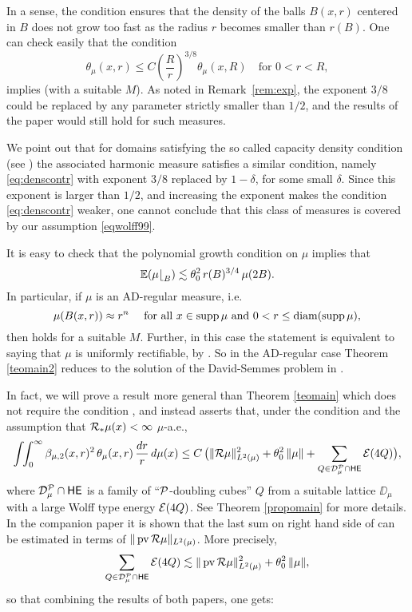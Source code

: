 \begin{rem}
	In a sense, the condition  ensures that the
	density of the balls $B(x,r)$ centered in $B$ does not grow too fast as the radius $r$ becomes
	smaller than $r(B)$. One can check easily that the condition
	\begin{equation}\label{eq:denscontr}
	\theta_{\mu}(x,r)\leq C\left(\frac{R}{r}\right)^{3/8}\theta_{\mu}(x,R)\quad\text{for $0<r<R$},
	\end{equation}
	implies  (with a suitable $M$). As noted in Remark~\ref{rem:exp}, the exponent $3/8$ could be replaced by any parameter strictly smaller than $1/2$, and the results of the paper would still hold for such measures. 
	
	We point out that for domains satisfying the so called capacity density condition (see \cite{AH}) the associated harmonic measure satisfies a similar condition, namely \eqref{eq:denscontr} with exponent $3/8$ replaced by $1-\delta$, for some small $\delta$. Since this exponent is larger than $1/2$, and increasing the exponent makes the condition \eqref{eq:denscontr} weaker, one cannot conclude that this class of measures is covered by our assumption \eqref{eqwolff99}.
\end{rem}

\begin{rem}\label{rem333}
	It is easy to check that the polynomial growth condition on $\mu$ implies that
	$$\mathbb E(\mu{\lfloor}_{B})\lesssim \theta_0^2\,r(B)^{3/4}\,\mu(2B).$$
	In particular, if $\mu$ is an AD-regular measure, i.e.\
	$$\mu(B(x,r))\approx r^n\quad \mbox{ for all $x\in\operatorname{supp}\mu$ and $0<r\leq{\rm diam}(\operatorname{supp}\mu)$},$$
	then \rf{eqwolff99} holds for a suitable $M$. Further, in this case the statement 
	is equivalent to saying that $\mu$ is uniformly rectifiable, by \cite{DS1}. So in the AD-regular case Theorem \ref{teomain2} reduces to
	the solution of the David-Semmes problem in \cite{NToV1}.
\end{rem}

In fact, we will prove a result more general than Theorem \ref{teomain} which does not
require the condition \rf{eqwolff99}, and instead asserts that, 
under the condition \rf{eqgrow00} and the assumption that ${\mathcal R}_*\mu(x)<\infty$ $\mu$-a.e.,
\begin{equation}\label{eqhe53}
	\int \!\!\int_0^\infty \beta_{\mu,2}(x,r)^2\,\theta_\mu(x,r)\,
	\frac{dr}r\,d\mu(x) \leq C\,\big(\|{\mathcal R}\mu\|_{L^2(\mu)}^2 + \theta_0^2\,\|\mu\|
	+ \sum_{Q\in{\mathcal D}_\mu^{\mathcal P}\cap{\mathsf {HE}}}{\mathcal E}(4Q)\big),
\end{equation}
where ${\mathcal D}_\mu^{\mathcal P}\cap{\mathsf {HE}}$ is a family of ``${\mathcal P}$-doubling cubes'' $Q$ from a suitable lattice $\DD_\mu$
with a large Wolff type energy ${\mathcal E}(4Q)$. See Theorem \ref{propomain} for more details.
In the companion paper \cite{Tolsa-riesz} it is shown that the last sum on right hand side of 
\rf{eqhe53} can be estimated in terms of $\|\operatorname{pv}{\mathcal R}\mu\|_{L^2(\mu)}$. More precisely,
\begin{equation}\label{eqhe6d3}
	\sum_{Q\in{\mathcal D}_\mu^{\mathcal P}\cap{\mathsf {HE}}}{\mathcal E}(4Q)\lesssim \|\operatorname{pv}{\mathcal R}\mu\|_{L^2(\mu)}^2 + \theta_0^2\,\|\mu\|,
\end{equation}
so that combining the results of both papers, one gets:

